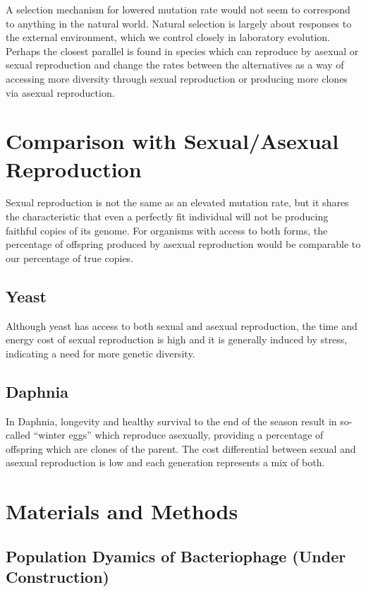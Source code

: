 \documentclass[10pt,letterpaper]{article}
\begin{document}
A selection mechanism for lowered mutation rate would not seem to correspond to anything in the natural world.  Natural selection is largely about responses to the external environment, which we control closely in laboratory evolution.  Perhaps the closest parallel is found in species which can reproduce by asexual or sexual reproduction and change the rates between the alternatives as a way of accessing more diversity through sexual reproduction or producing more clones via asexual reproduction.


\section*{Comparison with Sexual/Asexual Reproduction}
Sexual reproduction is not the same as an elevated mutation rate, but it shares the characteristic that even a perfectly fit individual will not be producing faithful copies of its genome. For organisms with access to both forms, the percentage of offspring produced by asexual reproduction would be comparable to our percentage of true copies.
\subsection*{Yeast}
Although yeast has access to both sexual and asexual reproduction, the time and energy cost of sexual reproduction is high and it is generally induced by stress, indicating a need for more genetic diversity.
\subsection*{Daphnia} 
In Daphnia, longevity and healthy survival to the end of the season result in so-called ``winter eggs'' which reproduce asexually, providing a percentage of offspring which are clones of the parent. The cost differential between sexual and asexual reproduction is low and each generation represents a mix of both.

\section*{Materials and Methods}

\subsection*{Population Dyamics of Bacteriophage (Under Construction)}
\end{document}
